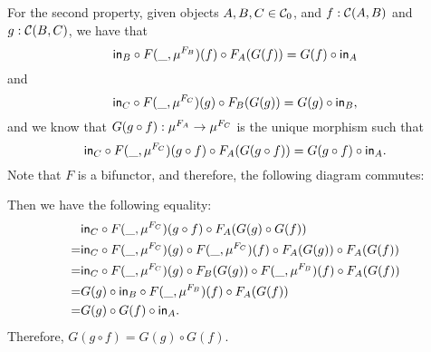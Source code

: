 \begin{solution}
	For the second property, given objects $ A, B, C \in {\mathcal{C}}_0 $, and $ f: \mathcal{C}(A, B) $ and $ g: \mathcal{C}(B, C) $, we have that
	\[ \mathsf{in}_B \circ F(\_, \mu^{F_B})(f) \circ F_A(G(f)) = G(f) \circ \mathsf{in}_A \]
	and
	\[ \mathsf{in}_C \circ F(\_, \mu^{F_C})(g) \circ F_B(G(g)) = G(g) \circ \mathsf{in}_B, \]
	and we know that $ G(g \circ f): \mu^{F_A} \to \mu^{F_C} $ is the unique morphism such that
	\[ \mathsf{in}_C \circ F(\_, \mu^{F_C})(g \circ f) \circ F_A(G(g \circ f)) = G(g \circ f) \circ \mathsf{in}_A. \]
	Note that $ F $ is a bifunctor, and therefore, the following diagram commutes:
	\begin{center}
	\end{center}
	Then we have the following equality:
	\begin{align*}
		& \mathsf{in}_C \circ F(\_, \mu^{F_C})(g \circ f) \circ F_A(G(g) \circ G(f))\\
		=& \mathsf{in}_C \circ F(\_, \mu^{F_C})(g) \circ F(\_, \mu^{F_C})(f) \circ F_A(G(g)) \circ F_A(G(f))\\
		=& \mathsf{in}_C \circ F(\_, \mu^{F_C})(g) \circ F_B(G(g)) \circ F(\_, \mu^{F_B})(f) \circ F_A(G(f))\\
		=& G(g) \circ \mathsf{in}_B \circ F(\_, \mu^{F_B})(f) \circ F_A(G(f))\\
		=& G(g) \circ G(f) \circ \mathsf{in}_A.
	\end{align*}
	Therefore, $ G(g \circ f) = G(g) \circ G(f) $.
\end{solution}

